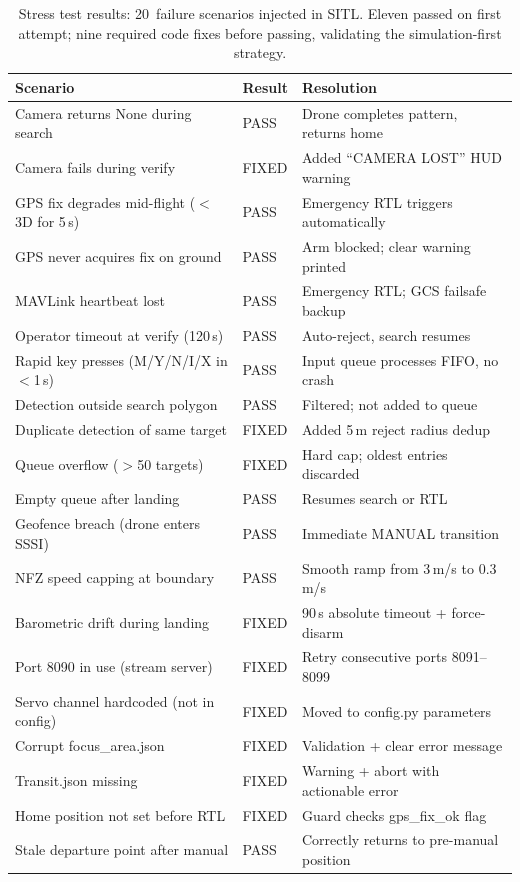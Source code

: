 \begin{table}[H]
\centering
\caption{Stress test results: 20~failure scenarios injected in SITL.  Eleven passed on first attempt; nine required code fixes before passing, validating the simulation-first strategy.}
\label{tab:stress-results}
\small
\begin{tabular}{@{}p{5.5cm}lp{5.5cm}@{}}
\toprule
\textbf{Scenario} & \textbf{Result} & \textbf{Resolution} \\
\midrule
Camera returns None during search & PASS & Drone completes pattern, returns home \\
Camera fails during verify & FIXED & Added ``CAMERA LOST'' HUD warning \\
GPS fix degrades mid-flight ($<$3D for 5\,s) & PASS & Emergency RTL triggers automatically \\
GPS never acquires fix on ground & PASS & Arm blocked; clear warning printed \\
MAVLink heartbeat lost & PASS & Emergency RTL; GCS failsafe backup \\
Operator timeout at verify (120\,s) & PASS & Auto-reject, search resumes \\
Rapid key presses (M/Y/N/I/X in $<$1\,s) & PASS & Input queue processes FIFO, no crash \\
Detection outside search polygon & PASS & Filtered; not added to queue \\
Duplicate detection of same target & FIXED & Added 5\,m reject radius dedup \\
Queue overflow ($>$50 targets) & FIXED & Hard cap; oldest entries discarded \\
Empty queue after landing & PASS & Resumes search or RTL \\
Geofence breach (drone enters SSSI) & PASS & Immediate MANUAL transition \\
NFZ speed capping at boundary & PASS & Smooth ramp from 3\,m/s to 0.3\,m/s \\
Barometric drift during landing & FIXED & 90\,s absolute timeout + force-disarm \\
Port 8090 in use (stream server) & FIXED & Retry consecutive ports 8091--8099 \\
Servo channel hardcoded (not in config) & FIXED & Moved to config.py parameters \\
Corrupt focus\_area.json & FIXED & Validation + clear error message \\
Transit.json missing & FIXED & Warning + abort with actionable error \\
Home position not set before RTL & FIXED & Guard checks gps\_fix\_ok flag \\
Stale departure point after manual & PASS & Correctly returns to pre-manual position \\
\bottomrule
\end{tabular}
\end{table}

